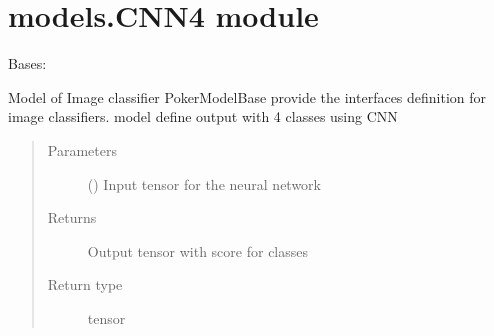 \documentclass[letterpaper,10pt,english]{sphinxmanual}
\begin{document}
\section{models.CNN4 module}
\label{\detokenize{models:module-models.CNN4}}\label{\detokenize{models:models-cnn4-module}}

\begin{fulllineitems}
\label{\detokenize{models:models.CNN4.model}}
\pysigstartsignatures
{}
\pysigstopsignatures
\sphinxAtStartPar
Bases: {\hyperref[\detokenize{models:models.base_model.PokerModelBase}]{}}

\sphinxAtStartPar
Model of Image classifier
PokerModelBase provide the interfaces definition for image classifiers.
model define output with 4 classes using CNN

\begin{fulllineitems}
\label{\detokenize{models:models.CNN4.model.forward}}
\pysigstartsignatures
{}
\pysigstopsignatures\begin{quote}\begin{description}
\item[{Parameters}] \leavevmode
\sphinxAtStartPar
{} () \textendash{} Input tensor for the neural network

\item[{Returns}] \leavevmode
\sphinxAtStartPar
{} \textendash{} Output tensor with score for classes

\item[{Return type}] \leavevmode
\sphinxAtStartPar
tensor

\end{description}\end{quote}

\end{fulllineitems}


\end{fulllineitems}
\end{document}
